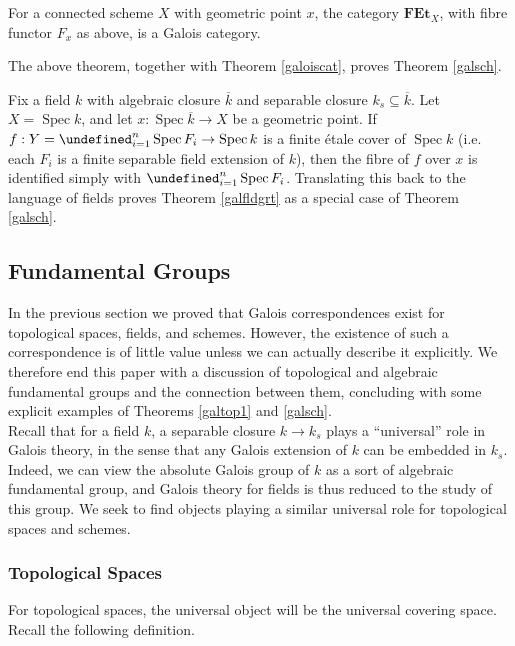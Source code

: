 \documentclass[11pt,openany]{book} %
\newcommand{\spc}{\operatorname{Spec}}
\let\coprod=\undefined
\begin{document}
\begin{theorem}
For a connected scheme $X$ with geometric point $x$, the category $\mathbf{FEt}_X$, with fibre functor $F_x$ as above, is a Galois category.
\end{theorem}

The above theorem, together with Theorem \ref{galoiscat}, proves Theorem \ref{galsch}.\\

\begin{example}
Fix a field $k$ with algebraic closure $\overline{k}$ and separable closure $k_s \subseteq \overline{k}$. Let $X = \spc k$, and let $x : \spc \overline{k} \to X$ be a geometric point. If $f : Y = \coprod_{i=1}^{n} \spc F_i \to \spc k$ is a finite \'etale cover of $\spc k$ (i.e. each $F_i$ is a finite separable field extension of $k$), then the fibre of $f$ over $x$ is identified simply with $\coprod_{i=1}^{n} \spc F_i$. Translating this back to the language of fields proves Theorem \ref{galfldgrt} as a special case of Theorem \ref{galsch}.
\end{example}
\medskip

\subsection{Fundamental Groups} \label{etalefun}
In the previous section we proved that Galois correspondences exist for topological spaces, fields, and schemes.  However, the existence of such a correspondence is of little value unless we can actually describe it explicitly. We therefore end this paper with a discussion of topological and algebraic fundamental groups and the connection between them, concluding with some explicit examples of Theorems \ref{galtop1} and \ref{galsch}.\\

Recall that for a field $k$, a separable closure $k \to k_s$ plays a ``universal'' role in Galois theory, in the sense that any Galois extension of $k$ can be embedded in $k_s$. Indeed, we can view the absolute Galois group of $k$ as a sort of algebraic fundamental group, and Galois theory for fields is thus reduced to the study of this group. We seek to find objects playing a similar universal role for topological spaces and schemes.\\

\subsubsection{Topological Spaces}
For topological spaces, the universal object will be the universal covering space. Recall the following definition.\\
\end{document}
